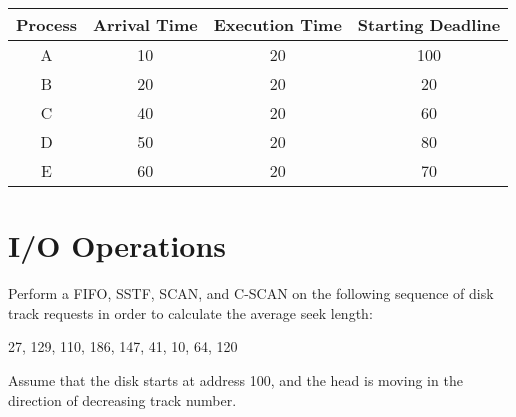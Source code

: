 \documentclass{article}
\begin{document}
\vspace{0.5cm}
\begin{center}
\begin{tabular}{|c|c|c|c|}
\hline
Process & Arrival Time & Execution Time & Starting Deadline\\
\hline
A & 10 & 20 & 100\\
B & 20 & 20 & 20\\
C & 40 & 20 & 60\\
D & 50 & 20 & 80\\
E & 60 & 20 & 70\\
\hline
\end{tabular}

\vspace{0.5cm}
\end{center}
\newpage



\section{I/O Operations}
Perform a FIFO, SSTF, SCAN, and C-SCAN on the following sequence of disk track requests
in order to calculate the average seek length:
\begin{center}
27, 129, 110, 186, 147, 41, 10, 64, 120
\end{center}
Assume that the disk starts at address 100, and the head is moving in the direction
of decreasing track number.
\end{document}

